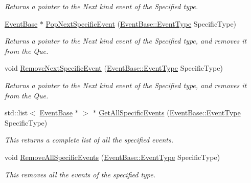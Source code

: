 \begin{DoxyCompactItemize}
\begin{DoxyCompactList}\small\item\em Returns a pointer to the Next kind event of the Specified type. \item\end{DoxyCompactList}\item 
\hyperlink{classphys_1_1EventBase}{EventBase} $\ast$ \hyperlink{classphys_1_1EventManager_a156ba3c53cc799499272430111bbdfa4}{PopNextSpecificEvent} (\hyperlink{classphys_1_1EventBase_a5e6a8564e127f654123f0bf6a2751923}{EventBase::EventType} SpecificType)
\begin{DoxyCompactList}\small\item\em Returns a pointer to the Next kind event of the Specified type, and removes it from the Que. \item\end{DoxyCompactList}\item 
void \hyperlink{classphys_1_1EventManager_a486c1173a2c1a64885bfdbe7ca267611}{RemoveNextSpecificEvent} (\hyperlink{classphys_1_1EventBase_a5e6a8564e127f654123f0bf6a2751923}{EventBase::EventType} SpecificType)
\begin{DoxyCompactList}\small\item\em Returns a pointer to the Next kind event of the Specified type, and removes it from the Que. \item\end{DoxyCompactList}\item 
std::list$<$ \hyperlink{classphys_1_1EventBase}{EventBase} $\ast$ $>$ $\ast$ \hyperlink{classphys_1_1EventManager_a300e537d27cd53ac8276438d4c91a3f6}{GetAllSpecificEvents} (\hyperlink{classphys_1_1EventBase_a5e6a8564e127f654123f0bf6a2751923}{EventBase::EventType} SpecificType)
\begin{DoxyCompactList}\small\item\em This returns a complete list of all the specified events. \item\end{DoxyCompactList}\item 
void \hyperlink{classphys_1_1EventManager_ac38a5a7d003a3f92e40c842916094bde}{RemoveAllSpecificEvents} (\hyperlink{classphys_1_1EventBase_a5e6a8564e127f654123f0bf6a2751923}{EventBase::EventType} SpecificType)
\begin{DoxyCompactList}\small\item\em This removes all the events of the specified type. \item\end{DoxyCompactList}\item 

\end{DoxyCompactItemize}
